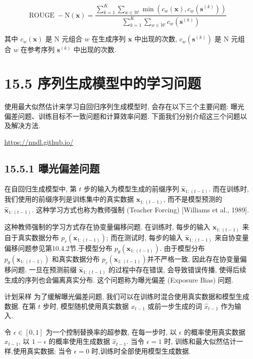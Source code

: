 \documentclass[10pt]{article}
\begin{document}
\begin{equation*}
\operatorname{ROUGE}-\mathrm{N}(\boldsymbol{x})=\frac{\sum_{k=1}^{K} \sum_{w \in \mathcal{W}} \min \left(c_{w}(\boldsymbol{x}), c_{w}\left(\boldsymbol{s}^{(k)}\right)\right)}{\sum_{k=1}^{K} \sum_{w \in \mathcal{W}} c_{w}\left(\boldsymbol{s}^{(k)}\right)} \tag{15.42}
\end{equation*}


其中 $c_{w}(\boldsymbol{x})$ 是 $\mathrm{N}$ 元组合 $w$ 在生成序列 $\boldsymbol{x}$ 中出现的次数, $c_{w}\left(\boldsymbol{s}^{(k)}\right)$ 是 $\mathrm{N}$ 元组合 $w$ 在参考序列 $\boldsymbol{s}^{(k)}$ 中出现的次数.

\section*{15.5 序列生成模型中的学习问题}
使用最大似然估计来学习自回归序列生成模型时, 会存在以下三个主要问题: 曝光偏差问题、训练目标不一致问题和计算效率问题. 下面我们分别介绍这三个问题以及解决方法.

\href{https://nndl.github.io/}{https://nndl.github.io/}

\subsection*{15.5.1 曝光偏差问题}
在自回归生成模型中, 第 $t$ 步的输入为模型生成的前缀序列 $\hat{\boldsymbol{x}}_{1:(t-1)}$. 而在训练时, 我们使用的前缀序列是训练集中的真实数据 $\boldsymbol{x}_{1:(t-1)}$, 而不是模型预测的 $\hat{\boldsymbol{x}}_{1:(t-1)}$. 这种学习方式也称为教师强制 (Teacher Forcing) [Williams et al., 1989].

这种教师强制的学习方式存在协变量偏移问题. 在训练时, 每步的输入 $\boldsymbol{x}_{1:(t-1)}$ 来自于真实数据分布 $p_{r}\left(\boldsymbol{x}_{1:(t-1)}\right)$; 而在测试时, 每步的输入 $\hat{\boldsymbol{x}}_{1:(t-1)}$ 来自协变量偏移问题参见第10.4.2节.于模型分布 $p_{\theta}\left(\boldsymbol{x}_{1:(t-1)}\right)$. 由于模型分布 $p_{\theta}\left(\boldsymbol{x}_{1:(t-1)}\right)$ 和真实数据分布 $p_{r}\left(\boldsymbol{x}_{1:(t-1)}\right)$并不严格一致, 因此存在协变量偏移问题. 一旦在预测前缀 $\hat{\boldsymbol{x}}_{1:(t-1)}$ 的过程中存在错误, 会导致错误传播, 使得后续生成的序列也会偏离真实分布. 这个问题称为曝光偏差 (Exposure Bias) 问题.

计划采样 为了缓解曝光偏差问题, 我们可以在训练时混合使用真实数据和模型生成数据. 在第 $t$ 步时, 模型随机使用真实数据 $x_{t-1}$ 或前一步生成的词 $\hat{x}_{t-1}$ 作为输入.

令 $\epsilon \in[0,1]$ 为一个控制替换率的超参数, 在每一步时, 以 $\epsilon$ 的概率使用真实数据 $x_{t-1}$, 以 $1-\epsilon$ 的概率使用生成数据 $\hat{x}_{t-1}$. 当令 $\epsilon=1$ 时, 训练和最大似然估计一样,使用真实数据; 当令 $\epsilon=0$ 时,训练时全部使用模型生成数据.
\end{document}
